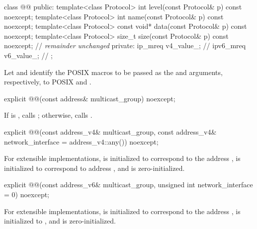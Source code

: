 \begin{codeblock}
class @@
{
public:
  template<class Protocol> int level(const Protocol& p) const noexcept;
  template<class Protocol> int name(const Protocol& p) const noexcept;
  template<class Protocol> const void* data(const Protocol& p) const noexcept;
  template<class Protocol> size_t size(const Protocol& p) const noexcept;
  // \textit{remainder unchanged}
private:
  ip_mreq v4_value_; // \expos
  ipv6_mreq v6_value_; // \expos
};
\end{codeblock}

\pnum
Let  and  identify the POSIX macros to be passed as the  and  arguments, respectively, to POSIX  and .

\begin{itemdecl}
explicit @@(const address& multicast_group) noexcept;
\end{itemdecl}

\begin{itemdescr}
\pnum
\effects If  is , calls ; otherwise, calls .
\end{itemdescr}

\begin{itemdecl}
explicit @@(const address_v4& multicast_group,
           const address_v4& network_interface = address_v4::any()) noexcept;
\end{itemdecl}

\begin{itemdescr}
\pnum
\effects For extensible implementations,  is initialized to correspond to the address ,  is initialized to correspond to address , and  is zero-initialized.
\end{itemdescr}

\begin{itemdecl}
explicit @@(const address_v6& multicast_group,
           unsigned int network_interface = 0) noexcept;
\end{itemdecl}

\begin{itemdescr}
\pnum
\effects For extensible implementations,  is initialized to correspond to the address ,  is initialized to , and  is zero-initialized.
\end{itemdescr}

